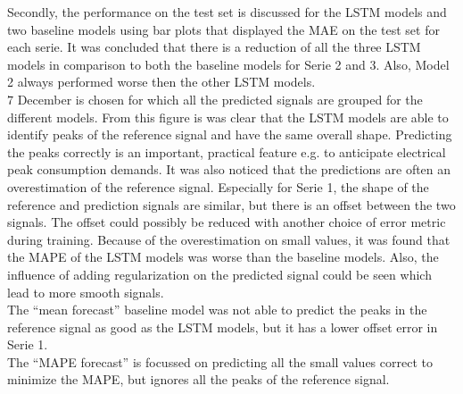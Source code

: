  Secondly, the performance on the test set is discussed for the LSTM models and two baseline models using bar plots that displayed the MAE on the test set for each serie. It was concluded that there is a reduction of all the three LSTM models in comparison to both the baseline models for Serie 2 and 3. Also, Model 2 always performed worse then the other LSTM models.\\ 
 $ 7 $ December is chosen for which all the predicted signals are grouped for the different models. From this figure is was clear that the LSTM models are able to identify peaks of the reference signal and have the same overall shape. Predicting the peaks correctly is an important, practical feature e.g. to anticipate electrical peak consumption demands. It was also noticed that the predictions are often an overestimation of the reference signal. Especially for Serie 1, the shape of the reference and prediction signals are similar, but there is an offset between the two signals. The offset could possibly be reduced with another choice of error metric during training. Because of the overestimation on small values, it was found that the MAPE of the LSTM models was worse than the baseline models. Also, the influence of adding regularization on the predicted signal could be seen which lead to more smooth signals.\\
 
The ``mean forecast'' baseline model was not able to predict the peaks in the reference signal as good as the LSTM models, but it has a lower offset error in Serie 1.\\
 
The ``MAPE forecast'' is focussed on predicting all the small values correct to minimize the MAPE, but ignores all the peaks of the reference signal.
 


